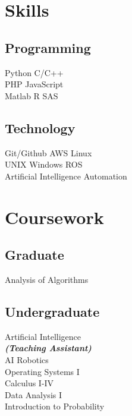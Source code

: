 \documentclass[]{cv}
\begin{document}
\begin{minipage}[t]{0.33\textwidth}



\section{Skills}
\subsection{Programming}
Python \textbullet{} C/C++ \\
PHP \textbullet{} JavaScript \\
Matlab \textbullet{} R \textbullet{} SAS \\
\sectionsep

\subsection{Technology}
Git/Github \textbullet{} AWS \textbullet{} Linux \\
UNIX \textbullet{} Windows \textbullet{} ROS \\
Artificial Intelligence \textbullet{} Automation \\
\sectionsep


\section{Coursework}
\subsection{Graduate}
Analysis of Algorithms
\sectionsep

\subsection{Undergraduate}
Artificial Intelligence \\
{\footnotesize \textit{\textbf{(Teaching Assistant) }}} \\
AI Robotics \\
Operating Systems I \\
Calculus I-IV \\
Data Analysis I \\
Introduction to Probability \\
\sectionsep


\end{minipage}
\end{document}
